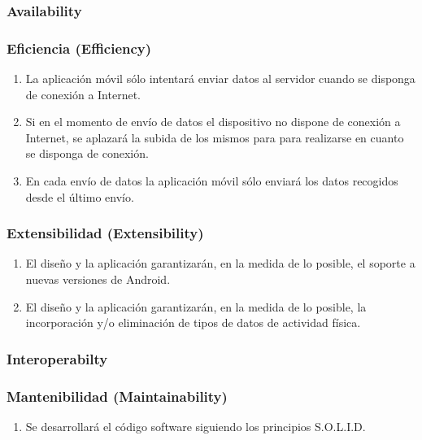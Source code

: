         \subsubsection{Availability}
        \subsubsection{Eficiencia (Efficiency)}
            \begin{enumerate}[label=\textbf{\texttt{RNF-\arabic*}}]
                \item La aplicación móvil sólo intentará enviar datos al servidor cuando se disponga de conexión a Internet.
                \item Si en el momento de envío de datos el dispositivo no dispone de conexión a Internet, se aplazará la subida de los mismos para para realizarse en cuanto se disponga de conexión.
                \item En cada envío de datos la aplicación móvil sólo enviará los datos recogidos desde el último envío.
            \end{enumerate}
        \subsubsection{Extensibilidad (Extensibility)}
            \begin{enumerate}[resume, label=\textbf{\texttt{RNF-\arabic*}}]
                \item El diseño y la aplicación garantizarán, en la medida de lo posible, el soporte a nuevas versiones de Android.
                \item El diseño y la aplicación garantizarán, en la medida de lo posible, la incorporación y/o eliminación de tipos de datos de actividad física.
            \end{enumerate}
        \subsubsection{Interoperabilty}
        \subsubsection{Mantenibilidad (Maintainability)}
            \begin{enumerate}[resume, label=\textbf{\texttt{RNF-\arabic*}}]
                \item Se desarrollará el código software siguiendo los principios S.O.L.I.D.
            \end{enumerate}

